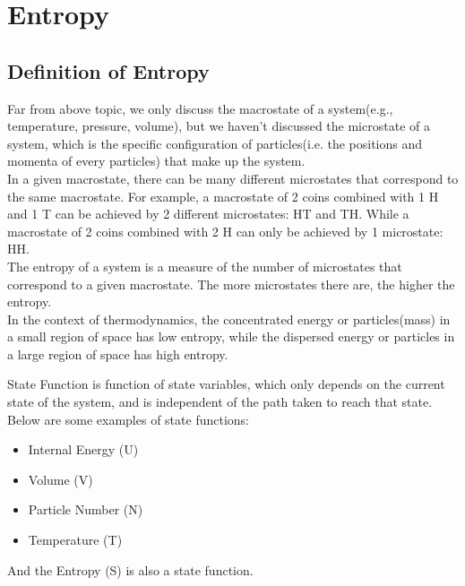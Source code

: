 \bigskip\noindent \bigskip\noindent \bigskip\noindent
\section{Entropy}
\subsection{Definition of Entropy}
\begin{intuition}
    Far from above topic, we only discuss the macrostate of a system(e.g., temperature, pressure, volume), but we haven't discussed the microstate of a system, which is the specific configuration of particles(i.e. the positions and momenta of every particles) that make up the system. \\

    In a given macrostate, there can be many different microstates that correspond to the same macrostate. For example, a macrostate of 2 coins combined with 1 H and 1 T can be achieved by 2 different microstates: HT and TH. While a macrostate of 2 coins combined with 2 H can only be achieved by 1 microstate: HH. \\

    The entropy of a system is a measure of the number of microstates that correspond to a given macrostate. The more microstates there are, the higher the entropy. \\

    In the context of thermodynamics, the concentrated energy or particles(mass) in a small region of space has low entropy, while the dispersed energy or particles in a large region of space has high entropy. \\
\end{intuition}

\bigskip\noindent
\begin{foundation}
    State Function is function of state variables, which only depends on the current state of the system, and is independent of the path taken to reach that state. \\
    Below are some examples of state functions:
    \begin{itemize}
        \item Internal Energy (U)
        \item Volume (V)
        \item Particle Number (N)
        \item Temperature (T)
    \end{itemize}

    And the Entropy (S) is also a state function.
\end{foundation}

